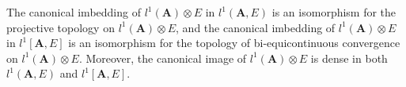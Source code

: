 The canonical imbedding of $l^1(\mathbf{A}) \otimes E$ in $l^1(\mathbf{A}, E)$ is an isomorphism for the projective topology on $l^1(\mathbf{A}) \otimes E$, and the canonical imbedding of $l^1(\mathbf{A}) \otimes E$ in $l^1[\mathbf{A}, E]$ is an isomorphism for the topology of bi-equicontinuous convergence on $l^1(\mathbf{A}) \otimes E$. Moreover, the canonical image of $l^1(\mathbf{A}) \otimes E$ is dense in both $l^1(\mathbf{A}, E)$ and $l^1[\mathbf{A}, E]$.
